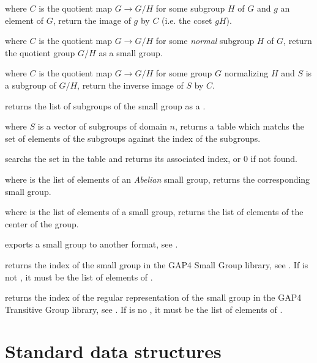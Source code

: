  where $C$ is the quotient map
$G\rightarrow G/H$ for some subgroup $H$ of $G$ and $g$ an element of $G$,
return the image of $g$ by $C$ (i.e. the coset $gH$).

 where $C$ is the quotient map
$G\rightarrow G/H$ for some \emph{normal} subgroup $H$ of $G$, return the
quotient group $G/H$ as a small group.

 where $C$ is the
quotient map $G\rightarrow G/H$ for some group $G$ normalizing $H$ and $S$ is
a subgroup of $G/H$, return the inverse image of $S$ by $C$.

 returns the list of subgroups of the
small group  as a .

 where $S$ is a vector of subgroups
of domain $n$, returns a table which matchs the set of elements of the
subgroups against the index of the subgroups.

 searchs the set  in
the table  and returns its associated index, or $0$ if not found.

 where  is the list of
elements of an \emph{Abelian} small group, returns the corresponding
small group.

 where  is the list of elements
of a small group, returns the list of elements of the center of the
group.

 exports a small group
to another format, see .

 returns the index of the small group
 in the GAP4 Small Group library, see . If
 is not , it must be the list of elements of .

 returns the index of the
regular representation of the small group  in the GAP4 Transitive
Group library, see . If  is no , it must be
the list of elements of .

\newpage
\chapter{Standard data structures}

